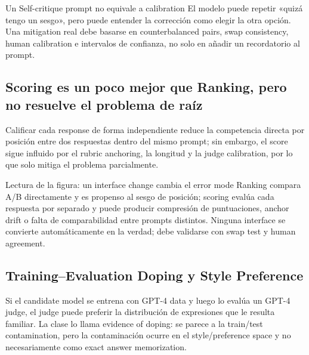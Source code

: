 \begin{warningbox}{Un Self-critique prompt no equivale a calibration}
El modelo puede repetir «quizá tengo un sesgo», pero puede entender la corrección como elegir la otra opción. Una mitigation real debe basarse en counterbalanced pairs, swap consistency, human calibration e intervalos de confianza, no solo en añadir un recordatorio al prompt.
\end{warningbox}


\subsection{Scoring es un poco mejor que Ranking, pero no resuelve el problema de raíz}

Calificar cada response de forma independiente reduce la competencia directa por posición entre dos respuestas dentro del mismo prompt; sin embargo, el score sigue influido por el rubric anchoring, la longitud y la judge calibration, por lo que solo mitiga el problema parcialmente.


\begin{knowledgebox}{Lectura de la figura: un interface change cambia el error mode}
Ranking compara A/B directamente y es propenso al sesgo de posición; scoring evalúa cada respuesta por separado y puede producir compresión de puntuaciones, anchor drift o falta de comparabilidad entre prompts distintos. Ninguna interface se convierte automáticamente en la verdad; debe validarse con swap test y human agreement.
\end{knowledgebox}

\subsection{Training--Evaluation Doping y Style Preference}

Si el candidate model se entrena con GPT-4 data y luego lo evalúa un GPT-4 judge, el judge puede preferir la distribución de expresiones que le resulta familiar. La clase lo llama evidence of doping: se parece a la train/test contamination, pero la contaminación ocurre en el style/preference space y no necesariamente como exact answer memorization.

